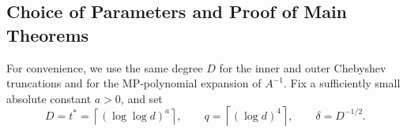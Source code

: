\documentclass[12pt]{article}
\newcommand{\calQ}{\mathcal{Q}}
\newcommand{\gam}{\gamma}
\begin{document}

\subsection{Choice of Parameters and Proof of Main Theorems}
\label{sec:parameter-instantiation}

For convenience, we use the same degree \(D\) for the inner and outer Chebyshev
truncations and for the MP-polynomial expansion of \(A^{-1}\). Fix a
sufficiently small absolute constant \(a>0\), and set
\[
    D=t^\ast=\left\lceil(\log \log d)^a\right\rceil,
    \qquad
    q=\left\lceil(\log d)^4\right\rceil,
    \qquad
    \delta=D^{-1/2}.
\]
\end{document}
